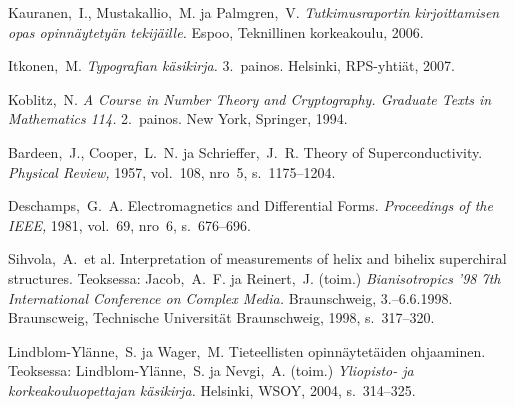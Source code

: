 \documentclass[english,12pt,a4paper,pdftex]{article}
\begin{document}
\clearpage


{}
\begin{thebibliography}{99}

 Kauranen,\ I., Mustakallio,\ M. ja Palmgren,\ V.
  \textit{Tutkimusraportin kirjoittamisen opas opinnäytetyän
    tekijäille.}  Espoo, Teknillinen korkeakoulu, 2006.

 Itkonen,\ M. \textit{Typografian käsikirja.} 3.\
  painos.  Helsinki, RPS-yhtiät, 2007.

 Koblitz,\ N. \textit{A Course in Number Theory and
    Cryptography. Graduate Texts in Mathematics 114.}  2.\ painos. New
  York, Springer, 1994.

\bibitem{bcs} Bardeen,\ J., Cooper,\ L.\ N. ja Schrieffer,\ J.\ R.
  Theory of Superconductivity. \textit{Physical Review,} 1957, vol.\
  108, nro~5, s.\ 1175--1204.

 Deschamps,\ G.\ A. Electromagnetics and
  Differential Forms. \textit{Proceedings of the IEEE,} 1981, vol.\
  69, nro~6, s.\ 676--696.

\bibitem{Sihvola} Sihvola,\ A.\ et al.
  \foreignlanguage{english}{Interpretation of measurements of helix
and bihelix superchiral structures.}  Teoksessa: Jacob,\ A.\ F. ja
  Reinert,\ J. (toim.) \textit{Bianisotropics '98 7th International
    Conference on Complex Media.}  Braunschweig, 3.--6.6.1998.
  Braunscweig, Technische Universität Braunschweig, 1998, s.\
  317--320.

 Lindblom-Ylänne,\ S. ja Wager,\ M.  Tieteellisten
  opinnäytetäiden ohjaaminen. Teoksessa: Lindblom-Ylänne,\ S. ja
  Nevgi,\ A. (toim.) \textit{Yliopisto- ja korkeakouluopettajan
    käsikirja.}  Helsinki, WSOY, 2004, s.\ 314--325.


\end{thebibliography}
\end{document}
